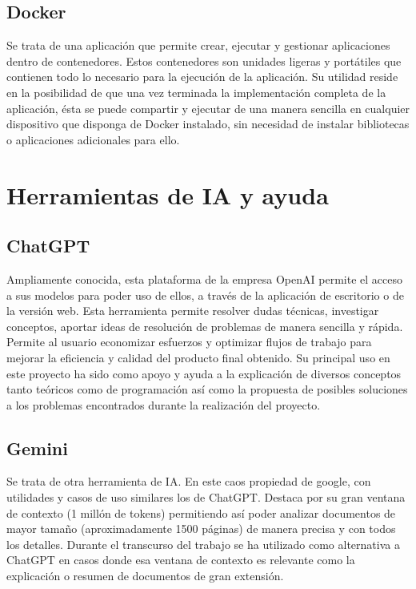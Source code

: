 \subsection{Docker}
Se trata de una aplicación que permite crear, ejecutar y gestionar aplicaciones dentro de contenedores\cite{DockerDocs2025}. Estos contenedores son unidades ligeras y portátiles que contienen todo lo necesario para la ejecución de la aplicación. Su utilidad reside en la posibilidad de que una vez terminada la implementación completa de la aplicación, ésta se puede compartir y ejecutar de una manera sencilla en cualquier dispositivo que disponga de Docker instalado, sin necesidad de instalar bibliotecas o aplicaciones adicionales para ello.


\section{Herramientas de IA y ayuda}

\subsection{ChatGPT} 
Ampliamente conocida, esta plataforma de la empresa OpenAI permite el acceso a sus modelos para poder uso de ellos, a través de la aplicación de escritorio o de la versión web. Esta herramienta permite resolver dudas técnicas, investigar conceptos, aportar ideas de resolución de problemas de manera sencilla y rápida. Permite al usuario economizar esfuerzos y optimizar flujos de trabajo para mejorar la eficiencia y calidad del producto final obtenido\cite{ChatGPT2025}. Su principal uso en este proyecto ha sido como apoyo y ayuda a la explicación de diversos conceptos tanto teóricos como de programación así como la propuesta de posibles soluciones a los problemas encontrados durante la realización del proyecto.

\subsection{Gemini}
Se trata de otra herramienta de IA. En este caos propiedad de google, con utilidades y casos de uso similares  los de ChatGPT. Destaca por su gran ventana de contexto (1 millón de tokens) permitiendo así poder analizar documentos de mayor tamaño (aproximadamente 1500 páginas) de manera precisa y con todos los detalles\cite{Gemini2025}. Durante el transcurso del trabajo se ha utilizado como alternativa a ChatGPT en casos donde esa ventana de contexto es relevante como la explicación o resumen de documentos de gran extensión.

